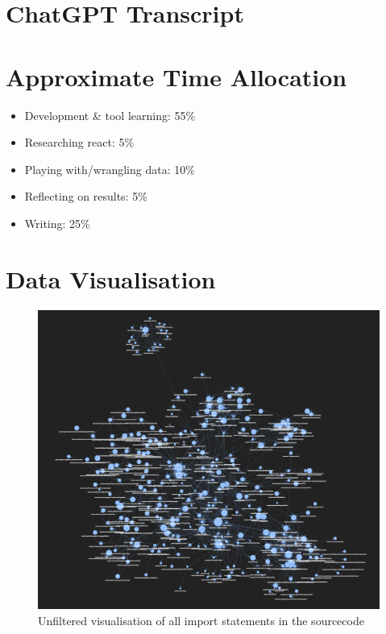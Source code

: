 \documentclass{article}
\begin{document}
\clearpage



\clearpage
\appendix
\section{ChatGPT Transcript}
\label{apx:a}
\begin{figure}[h]

\end{figure}


\clearpage
\section{Approximate Time Allocation}
\label{apx:c}
\begin{itemize}
  \item Development \& tool learning: 55\%
  \item Researching react: 5\%
  \item Playing with/wrangling data: 10\%
  \item Reflecting on results: 5\%
  \item Writing: 25\%
\end{itemize}

\clearpage
\section{Data Visualisation}
\label{apx:d}

\begin{figure}[h]
\includegraphics[width=\textwidth]{graphics/raw_imports.png}
\caption{Unfiltered visualisation of all import statements in the sourcecode}
\label{fig:d:raw}
\end{figure}
\end{document}
